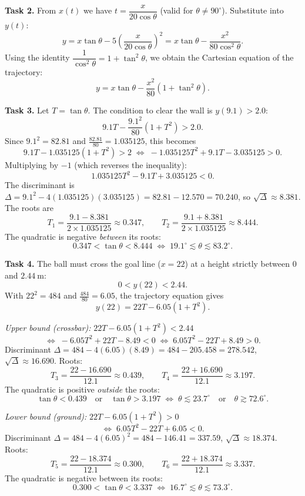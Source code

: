 \documentclass[11pt]{article}
\begin{document}
\textbf{Task 2.} From $x(t)$ we have $t = \dfrac{x}{20\cos\theta}$ (valid for $\theta\neq90^{\circ}$). Substitute into $y(t)$:
\[ y = x\tan\theta - 5\left(\frac{x}{20\cos\theta}\right)^{2} = x\tan\theta - \frac{x^{2}}{80\cos^{2}\theta}. \]
Using the identity $\dfrac{1}{\cos^{2}\theta} = 1 + \tan^{2}\theta$, we obtain the Cartesian equation of the trajectory:
\[ y = x\tan\theta - \frac{x^{2}}{80}\left(1+\tan^{2}\theta\right). \]

\textbf{Task 3.} Let $T = \tan\theta$. The condition to clear the wall is $y(9.1) > 2.0$:
\[ 9.1T - \frac{9.1^{2}}{80}(1+T^{2}) > 2.0. \]
Since $9.1^{2}=82.81$ and $\frac{82.81}{80}=1.035125$, this becomes
\[ 9.1T - 1.035125(1+T^{2}) > 2 \;\Longleftrightarrow\; -1.035125T^{2} + 9.1T - 3.035125 > 0. \]
Multiplying by $-1$ (which reverses the inequality):
\[ 1.035125T^{2} - 9.1T + 3.035125 < 0. \]
The discriminant is $\Delta = 9.1^{2} - 4(1.035125)(3.035125) = 82.81 - 12.570 = 70.240$, so $\sqrt{\Delta} \approx 8.381$. The roots are
\[ T_{1} = \frac{9.1 - 8.381}{2\times1.035125} \approx 0.347, \qquad T_{2} = \frac{9.1 + 8.381}{2\times1.035125} \approx 8.444. \]
The quadratic is negative \emph{between} its roots:
\[ 0.347 < \tan\theta < 8.444 \;\Longleftrightarrow\; 19.1^{\circ} \lesssim \theta \lesssim 83.2^{\circ}. \]

\textbf{Task 4.} The ball must cross the goal line ($x=22$) at a height strictly between $0$ and $2.44\ \mathrm{m}$:
\[ 0 < y(22) < 2.44. \]
With $22^{2}=484$ and $\frac{484}{80}=6.05$, the trajectory equation gives
\[ y(22) = 22T - 6.05(1+T^{2}). \]

\emph{Upper bound (crossbar):} $22T - 6.05(1+T^{2}) < 2.44$
\[ \Longleftrightarrow\; -6.05T^{2} + 22T - 8.49 < 0 \;\Longleftrightarrow\; 6.05T^{2} - 22T + 8.49 > 0. \]
Discriminant $\Delta = 484 - 4(6.05)(8.49) = 484 - 205.458 = 278.542$, $\sqrt{\Delta}\approx 16.690$. Roots:
\[ T_{3} = \frac{22 - 16.690}{12.1} \approx 0.439, \qquad T_{4} = \frac{22 + 16.690}{12.1} \approx 3.197. \]
The quadratic is positive \emph{outside} the roots:
\[ \tan\theta < 0.439 \quad\text{or}\quad \tan\theta > 3.197 \;\Longleftrightarrow\; \theta \lesssim 23.7^{\circ} \quad\text{or}\quad \theta \gtrsim 72.6^{\circ}. \]

\emph{Lower bound (ground):} $22T - 6.05(1+T^{2}) > 0$
\[ \Longleftrightarrow\; 6.05T^{2} - 22T + 6.05 < 0. \]
Discriminant $\Delta = 484 - 4(6.05)^{2} = 484 - 146.41 = 337.59$, $\sqrt{\Delta}\approx 18.374$. Roots:
\[ T_{5} = \frac{22 - 18.374}{12.1} \approx 0.300, \qquad T_{6} = \frac{22 + 18.374}{12.1} \approx 3.337. \]
The quadratic is negative between its roots:
\[ 0.300 < \tan\theta < 3.337 \;\Longleftrightarrow\; 16.7^{\circ} \lesssim \theta \lesssim 73.3^{\circ}. \]
\end{document}
